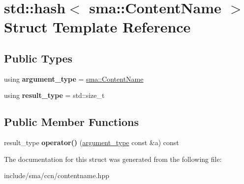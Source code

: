 \hypertarget{structstd_1_1hash_3_01sma_1_1ContentName_01_4}{\section{std\-:\-:hash$<$ sma\-:\-:Content\-Name $>$ Struct Template Reference}
\label{structstd_1_1hash_3_01sma_1_1ContentName_01_4}
}
\subsection*{Public Types}
\begin{DoxyCompactItemize}
\item 
\hypertarget{structstd_1_1hash_3_01sma_1_1ContentName_01_4_a7092be18c3d9018045a00e06d249f9c5}{using {\bfseries argument\-\_\-type} = \hyperlink{structsma_1_1ContentName}{sma\-::\-Content\-Name}}\label{structstd_1_1hash_3_01sma_1_1ContentName_01_4_a7092be18c3d9018045a00e06d249f9c5}

\item 
\hypertarget{structstd_1_1hash_3_01sma_1_1ContentName_01_4_a2a85a37789944d25c03743dc6f306acd}{using {\bfseries result\-\_\-type} = std\-::size\-\_\-t}\label{structstd_1_1hash_3_01sma_1_1ContentName_01_4_a2a85a37789944d25c03743dc6f306acd}

\end{DoxyCompactItemize}
\subsection*{Public Member Functions}
\begin{DoxyCompactItemize}
\item 
\hypertarget{structstd_1_1hash_3_01sma_1_1ContentName_01_4_aa87628bfbf5ca3191e3f9f01818f9046}{result\-\_\-type {\bfseries operator()} (\hyperlink{structsma_1_1ContentName}{argument\-\_\-type} const \&a) const }\label{structstd_1_1hash_3_01sma_1_1ContentName_01_4_aa87628bfbf5ca3191e3f9f01818f9046}

\end{DoxyCompactItemize}


The documentation for this struct was generated from the following file\-:\begin{DoxyCompactItemize}
\item 
include/sma/ccn/contentname.\-hpp\end{DoxyCompactItemize}
